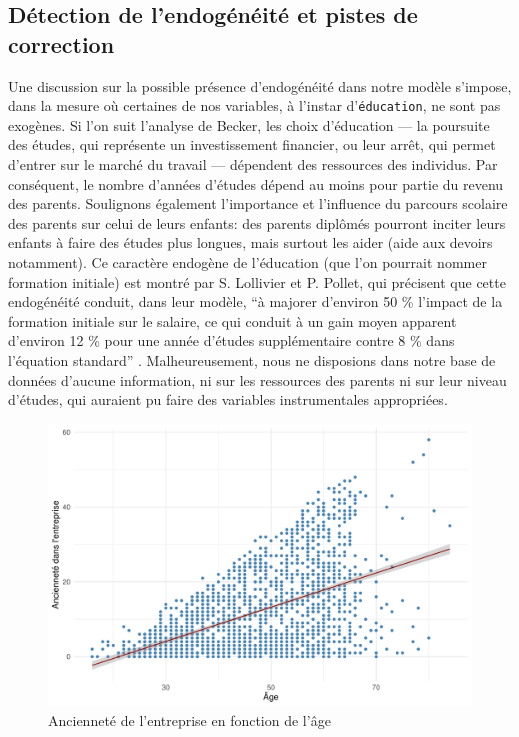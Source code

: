 \documentclass[a4paper, french, 11 pt]{article}\usepackage[]{graphicx}\usepackage[]{xcolor}
\begin{document}
\subsection{Détection de l’endogénéité et pistes de correction}

 Une discussion sur la possible présence d’endogénéité dans notre modèle s’impose, dans la mesure où certaines de nos variables, à l'instar d'\texttt{éducation}, ne sont pas exogènes. Si l'on suit l'analyse de Becker, les choix d'éducation --- la poursuite des études, qui représente un investissement financier, ou leur arrêt, qui permet d'entrer sur le marché du travail --- dépendent des ressources des individus. Par conséquent, le nombre d'années d'études dépend au moins pour partie du revenu des parents. Soulignons également l’importance et l’influence du parcours scolaire des parents sur celui de leurs enfants: des parents diplômés pourront inciter leurs enfants à faire des études plus longues, mais surtout les aider (aide aux devoirs notamment). Ce caractère endogène de l'éducation (que l'on pourrait nommer formation initiale) est montré par S. Lollivier et P. Pollet, qui précisent que cette endogénéité conduit, dans leur modèle, \enquote{à majorer d’environ 50 \% l’impact de la formation initiale sur le salaire, ce qui conduit à un gain moyen apparent d’environ 12 \% pour une année d’études supplémentaire contre 8 \% dans l’équation standard} \parencite{lollivier2003}. Malheureusement, nous ne disposions dans notre base de données d'aucune information, ni sur les ressources des parents ni sur leur niveau d'études, qui auraient pu faire des variables instrumentales appropriées. 
 




\begin{figure}[h]
\center
\includegraphics[width=0.7\linewidth]{figure/exp_age.pdf}
\caption{Ancienneté de l'entreprise en fonction de l'âge\label{fig:exp_age}}
\end{figure}
\end{document}
